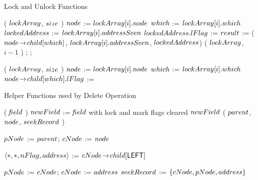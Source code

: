 \begin{limitscope}
\begin{algorithm}[htp]
\caption{Lock and Unlock Functions} 
\label{algo:lock:unlock}
\DefineKeyWords
\DontPrintSemicolon
\Boolean \LockAll( $lockArray$, $size$ )\;
\PrintSemicolon
\Begin
{
	 {
			\label{lin:lock|begin}
			$node$ := $lockArray[i].node$\;
			$which$ := $lockArray[i].which$\;
			$lockedAddress$ := $lockArray[i].addressSeen$\;
			$lockedAddress.lFlag$ := \True\;
			$\result$ := \CAS($node \!\rightarrow\! child[which]$, $lockArray[i].addressSeen$, $lockedAddress$)\;
			\If{\LNot($\result$)}
			{
			   \UnlockAll( $lockArray$, $i - 1$ )\;
				 \Return \False;
			}
	 }
	 \Return \True;
	 \label{lin:lock|end}
}


\BlankLine

\DontPrintSemicolon
\UnlockAll( $lockArray$, $size$ )\;
\PrintSemicolon
\Begin
{
		{
				\label{lin:unlock|begin}
		   $node$ := $lockArray[i].node$\;
			 $which$ := $lockArray[i].which$\;
			 $node \!\rightarrow\! child[which].lFlag$ := \False\;
			 \label{lin:unlock|end}
		}	
}				
				
\end{algorithm}

\begin{algorithm}[htp]
\caption{Helper Functions used by Delete Operation} 
\label{algo:helper}
\DefineKeyWords
\DontPrintSemicolon
\Word \ClearFlags( \Word $\!f\!ield$ )\;
\PrintSemicolon
\Begin
{
		\label{lin:clearFlags|begin}
   $newField$ := $\!f\!ield$ with lock and mark flags cleared\;
	 \Return $newField$\;
	 \label{lin:clearFlags|end}
}
\BlankLine
\DontPrintSemicolon
\FindSmallest( $parent$, $node$, $seekRecord$ )\;
\PrintSemicolon
\Begin
{
		\label{lin:findSmallest|begin}
   $pNode$ := $parent$; \qquad
	 $cNode$ := $node$\;
	
	 \BlankLine
	
	 \While{\True}
	 {
	    $\langle  \ast, \ast, nFlag, address  \rangle$ := $cNode \!\rightarrow\! child[\textsf{LEFT}]$\;
			
			\uIf{\LNot($\nFlag$)}
			{
			   $pNode$ := $cNode$; \qquad
				 $cNode$ := $address$\;
			}
			\Else
			{  
			   $seekRecord$ := $\{  cNode, pNode, address  \}$\;
			   \Break\;
				 \label{lin:findSmallest|end}
			}
	 }
	 
}
\end{algorithm}
\end{limitscope}

